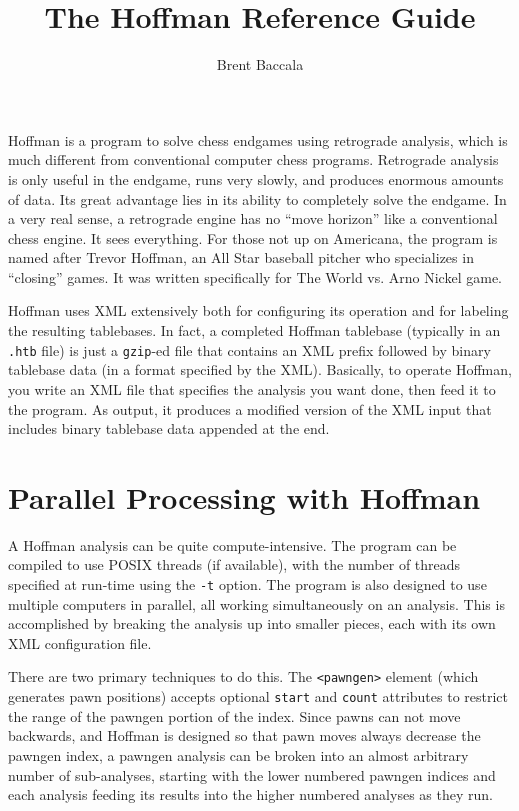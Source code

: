 \documentclass[11pt]{article}
\title{The Hoffman Reference Guide}
\author{Brent Baccala}
\begin{document}
\maketitle

\parindent 0pt
\parskip 12pt

Hoffman is a program to solve chess endgames using retrograde
analysis, which is much different from conventional computer chess
programs.  Retrograde analysis is only useful in the endgame, runs
very slowly, and produces enormous amounts of data.  Its great
advantage lies in its ability to completely solve the endgame.  In a
very real sense, a retrograde engine has no ``move horizon'' like a
conventional chess engine.  It sees everything.  For those not up on
Americana, the program is named after Trevor Hoffman, an All Star
baseball pitcher who specializes in ``closing'' games.  It was written
specifically for The World vs. Arno Nickel game.

Hoffman uses XML extensively both for configuring its operation and
for labeling the resulting tablebases.  In fact, a completed Hoffman
tablebase (typically in an {\tt .htb} file) is just a {\tt gzip}-ed
file that contains an XML prefix followed by binary tablebase data (in
a format specified by the XML).  Basically, to operate Hoffman, you
write an XML file that specifies the analysis you want done, then feed
it to the program.  As output, it produces a modified version of the
XML input that includes binary tablebase data appended at the end.

\section{Parallel Processing with Hoffman}

A Hoffman analysis can be quite compute-intensive.  The program can be
compiled to use POSIX threads (if available), with the number of
threads specified at run-time using the {\tt -t} option.  The program
is also designed to use multiple computers in parallel, all working
simultaneously on an analysis.  This is accomplished by breaking the
analysis up into smaller pieces, each with its own XML configuration
file.



There are two primary techniques to do this.  The {\tt <pawngen>}
element (which generates pawn positions) accepts optional {\tt start}
and {\tt count} attributes to restrict the range of the pawngen
portion of the index.  Since pawns can not move backwards, and Hoffman
is designed so that pawn moves always decrease the pawngen index, a
pawngen analysis can be broken into an almost arbitrary number of
sub-analyses, starting with the lower numbered pawngen indices and
each analysis feeding its results into the higher numbered analyses
as they run.
\end{document}
